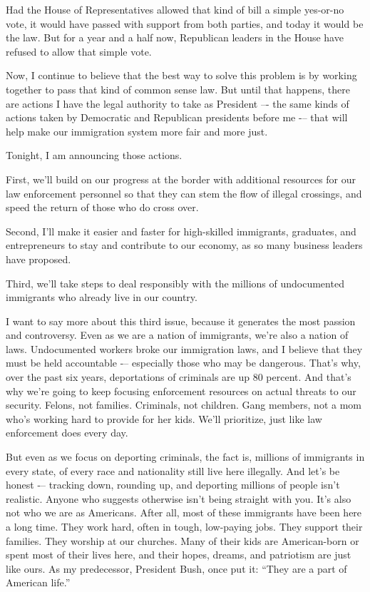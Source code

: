\documentclass[10pt,a4paper]{article}
\begin{document}
Had the House of Representatives allowed that kind of bill a simple yes-or-no vote, it would have passed with support from both parties, and today it would be the law. But for a year and a half now, Republican leaders in the House have refused to allow that simple vote.

Now, I continue to believe that the best way to solve this problem is by working together to pass that kind of common sense law. But until that happens, there are actions I have the legal authority to take as President –- the same kinds of actions taken by Democratic and Republican presidents before me -– that will help make our immigration system more fair and more just.

Tonight, I am announcing those actions.

First, we’ll build on our progress at the border with additional resources for our law enforcement personnel so that they can stem the flow of illegal crossings, and speed the return of those who do cross over.

Second, I’ll make it easier and faster for high-skilled immigrants, graduates, and entrepreneurs to stay and contribute to our economy, as so many business leaders have proposed.

Third, we’ll take steps to deal responsibly with the millions of undocumented immigrants who already live in our country.

I want to say more about this third issue, because it generates the most passion and controversy. Even as we are a nation of immigrants, we’re also a nation of laws. Undocumented workers broke our immigration laws, and I believe that they must be held accountable -– especially those who may be dangerous. That’s why, over the past six years, deportations of criminals are up 80 percent. And that’s why we’re going to keep focusing enforcement resources on actual threats to our security. Felons, not families. Criminals, not children. Gang members, not a mom who’s working hard to provide for her kids. We’ll prioritize, just like law enforcement does every day.

But even as we focus on deporting criminals, the fact is, millions of immigrants in every state, of every race and nationality still live here illegally. And let’s be honest -– tracking down, rounding up, and deporting millions of people isn’t realistic. Anyone who suggests otherwise isn’t being straight with you. It’s also not who we are as Americans. After all, most of these immigrants have been here a long time. They work hard, often in tough, low-paying jobs. They support their families. They worship at our churches. Many of their kids are American-born or spent most of their lives here, and their hopes, dreams, and patriotism are just like ours. As my predecessor, President Bush, once put it: “They are a part of American life.”
\end{document}
